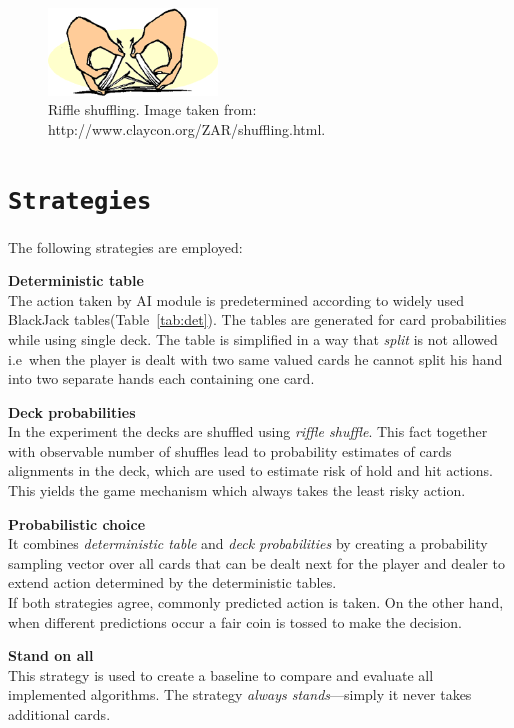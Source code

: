 \documentclass[12pt,a4paper,twocolumn]{article}
\begin{document}
\begin{figure}[htbp]
\centering
\includegraphics[width=0.4\textwidth]{shuffle}
\caption{Riffle shuffling. Image taken from: http://www.claycon.org/ZAR/shuffling.html.\label{fig:shufflin}}
\end{figure}

\section*{\texttt{Strategies}}
The following strategies are employed:
\begin{description}
\item{\textbf{Deterministic table}} \hfill\\
The action taken by AI module is predetermined according to widely used BlackJack tables(Table~\ref{tab:det}). The tables are generated for card probabilities while using single deck. The table is simplified in a way that \emph{split} is not allowed i.e\ when the player is dealt with two same valued cards he cannot split his hand into two separate hands each containing one card.
\item{\textbf{Deck probabilities}} \hfill\\
In the experiment the decks are shuffled using \emph{riffle shuffle}. This fact together with observable number of shuffles lead to probability estimates of cards alignments in the deck, which are used to estimate risk of hold and hit actions. This yields the game mechanism which always takes the least risky action.
\item{\textbf{Probabilistic choice}} \hfill\\
It combines \emph{deterministic table} and \emph{deck probabilities} by creating a probability sampling vector over all cards that can be dealt next for the player and dealer to extend action determined by the deterministic tables.\\
If both strategies agree, commonly predicted action is taken. On the other hand, when different predictions occur a fair coin is tossed to make the decision.
\item{\textbf{Stand on all}} \hfill\\
This strategy is used to create a baseline to compare and evaluate all implemented algorithms. The strategy \emph{always stands}---simply it never takes additional cards.
\end{description}
\end{document}
